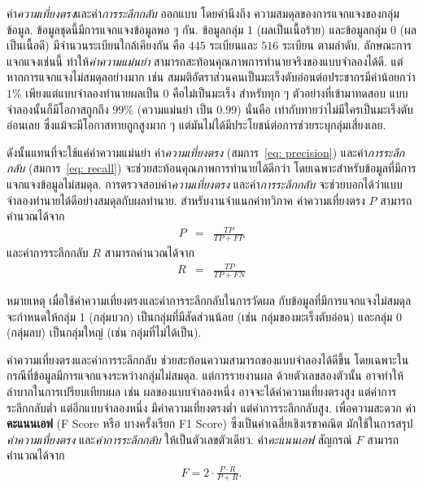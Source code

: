 \begin{Exercise}
ค่า\textit{ความเที่ยงตรง}และค่า\textit{การระลึกกลับ}
ออกแบบ โดยคำนึงถึง
ความสมดุลของการแจกแจงของกลุ่มข้อมูล.
ข้อมูลชุดนี้มีการแจกแจงข้อมูลพอ ๆ กัน.
ข้อมูลกลุ่ม 1 (ผลเป็นเนื้อร้าย) 
และข้อมูลกลุ่ม 0 (ผลเป็นเนื้อดี)
มีจำนวนระเบียนใกล้เคียงกัน คือ $445$ ระเบียนและ $516$ ระเบียน ตามลำดับ.
ลักษณะการแจกแจงเช่นนี้
ทำให้\textit{ค่าความแม่นยำ}
สามารถสะท้อนคุณภาพการทำนายจริงของแบบจำลองได้ดี.
%
แต่หากการแจกแจงไม่สมดุลอย่างมาก เช่น สมมติอัตราส่วนคนเป็นมะเร็งตับอ่อนต่อประชากรมีค่าน้อยกว่า $1\%$ เพียงแต่แบบจำลองทำนายผลเป็น $0$ คือไม่เป็นมะเร็ง สำหรับทุก ๆ ตัวอย่างที่เข้ามาทดสอบ 
แบบจำลองนั้นก็มีโอกาสถูกถึง $99\%$ (ความแม่นยำ เป็น $0.99$)
นั่นคือ เท่ากับทายว่าไม่มีใครเป็นมะเร็งตับอ่อนเลย ซึ่งแม้จะมีโอกาสทายถูกสูงมาก ๆ 
แต่มันไม่ได้มีประโยชน์ต่อการช่วยระบุกลุ่มเสี่ยงเลย.

ดังนั้นแทนที่จะใช้แค่ค่าความแม่นยำ
ค่า\textit{ความเที่ยงตรง} (สมการ~\ref{eq: precision}) และค่า\textit{การระลึกกลับ} (สมการ~\ref{eq: recall}) 
จะช่วยสะท้อนคุณภาพการทำนายได้ดีกว่า
โดยเฉพาะสำหรับข้อมูลที่มีการแจกแจงข้อมูลไม่สมดุล.
การตรวจสอบค่า\textit{ความเที่ยงตรง} และค่า\textit{การระลึกกลับ}
จะช่วยบอกได้ว่าแบบจำลองทำนายได้ดีอย่างสมดุลกับผลทำนาย.
%
สำหรับงานจำแนกค่าทวิภาค 
ค่าความเที่ยงตรง $P$ สามารถคำนวณได้จาก
\begin{eqnarray}
P &=& \frac{TP}{TP + FP}
\label{eq: precision}
\end{eqnarray}
และค่าการระลึกกลับ $R$ สามารถคำนวณได้จาก
\begin{eqnarray}
R &=& \frac{TP}{TP + FN}
\label{eq: recall}
\end{eqnarray}

หมายเหตุ เมื่อใช้ค่าความเที่ยงตรงและค่าการระลึกกลับในการวัดผล
กับข้อมูลที่มีการแจกแจงไม่สมดุล
จะกำหนดให้{กลุ่ม} 1 (กลุ่มบวก) เป็นกลุ่มที่มีสัดส่วนน้อย (เช่น กลุ่มของมะเร็งตับอ่อน) 
และ{กลุ่ม} 0 (กลุ่มลบ) เป็นกลุ่มใหญ่ (เช่น กลุ่มที่ไม่ได้เป็น).

ค่าความเที่ยงตรงและค่าการระลึกกลับ
ช่วยสะท้อนความสามารถของแบบจำลองได้ดีขึ้น โดยเฉพาะในกรณีที่ข้อมูลมีการแจกแจงระหว่างกลุ่มไม่สมดุล.
%
แต่การรายงานผล ด้วยตัวเลขสองตัวนั้น
อาจทำให้ลำบากในการเปรียบเทียบผล 
เช่น ผลของแบบจำลองหนึ่ง
อาจจะได้ค่าความเที่ยงตรงสูง แต่ค่าการระลึกกลับต่ำ 
แต่อีกแบบจำลองหนึ่ง มีค่าความเที่ยงตรงต่ำ
แต่ค่าการระลึกกลับสูง.
เพื่อความสะดวก ค่า\textbf{คะแนนเอฟ} (F Score หรือ บางครั้งเรียก F1 Score) ซึ่งเป็นค่าเฉลี่ยเชิงเรขาคณิต
มักใช้ในการสรุป
\textit{ค่าความเที่ยงตรง}
และ\textit{ค่าการระลึกกลับ} ให้เป็นตัวเลขตัวเดียว.
ค่า\textit{คะแนนเอฟ} สัญกรณ์ $F$ สามารถคำนวณได้จาก
\begin{eqnarray}
F = 2 \cdot \frac{P \cdot R}{P + R}
\label{eq: F score}.
\end{eqnarray}


\end{Exercise}
